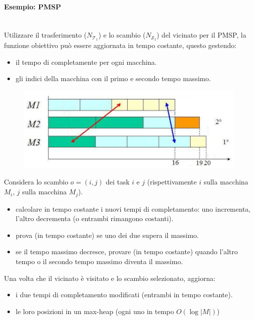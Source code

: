 \documentclass{article}
\begin{document}
\paragraph{Esempio: PMSP}\mbox{}\\
Utilizzare il trasferimento ($N_{\mathcal{T}_1}$) e lo scambio ($N_{\mathcal{S}_1}$) del vicinato
per il PMSP, la funzione obiettivo può essere aggiornata in tempo costante, questo gestendo:
\begin{itemize}
    \item il tempo di completamente per ogni macchina.
    \item gli indici della macchina con il primo e secondo tempo massimo.
\end{itemize}
\begin{figure}[H]
    \centering
    \includegraphics[scale=0.5]{images/lez14_2.png}
\end{figure}
Considera lo scambio $o=(i,j)$ dei task $i$ e $j$ (rispettivamente $i$ sulla macchina $M_i$,
$j$ sulla macchina $M_j$).
\begin{itemize}
    \item calcolare in tempo costante i nuovi tempi di completamento: uno incrementa,
    l'altro decrementa (o entrambi rimangono costanti).
    \item prova (in tempo costante) se uno dei due supera il massimo.
    \item se il tempo massimo decresce, provare (in tempo costante) quando l'altro
    tempo o il secondo tempo massimo diventa il massimo.
\end{itemize}

Una volta che il vicinato è visitato e lo scambio selezionato, aggiorna:
\begin{itemize}
    \item i due tempi di completamento modificati (entrambi in tempo costante).
    \item le loro posizioni in un max-heap (ogni uno in tempo $O(\log |M|)$)
\end{itemize}
\end{document}
